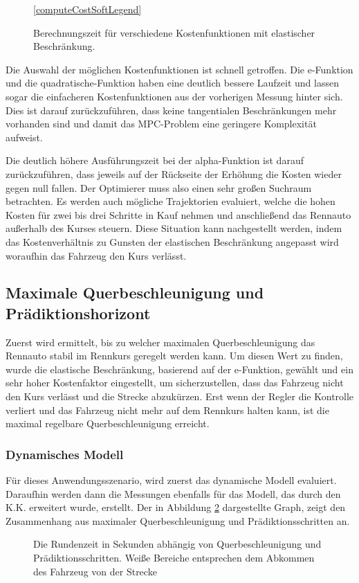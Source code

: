 \documentclass{like}
\begin{document}
\begin{figure}[ht!]
	\centering
	 
	\ref{computeCostSoftLegend}
	\caption{Berechnungszeit für verschiedene Kostenfunktionen mit elastischer Beschränkung.}
	\label{fig:computeCostSoftConst}
\end{figure}

Die Auswahl der möglichen Kostenfunktionen ist schnell getroffen. Die e-Funktion und die quadratische-Funktion haben eine deutlich bessere Laufzeit und lassen sogar die einfacheren Kostenfunktionen aus der vorherigen Messung hinter sich. Dies ist darauf zurückzuführen, dass keine tangentialen Beschränkungen mehr vorhanden sind und damit das \ac{MPC}-Problem eine geringere Komplexität aufweist.

Die deutlich höhere Ausführungszeit bei der alpha-Funktion ist darauf zurückzuführen, dass jeweils auf der Rückseite der Erhöhung die Kosten wieder gegen null fallen. Der Optimierer muss also einen sehr großen Suchraum betrachten. Es werden auch mögliche Trajektorien evaluiert, welche die hohen Kosten für zwei bis drei Schritte in Kauf nehmen und anschließend das Rennauto außerhalb des Kurses steuern. Diese Situation kann nachgestellt werden, indem das Kostenverhältnis zu Gunsten der elastischen Beschränkung angepasst wird woraufhin das Fahrzeug den Kurs verlässt.  


\subsection{Maximale Querbeschleunigung und Prädiktionshorizont}
Zuerst wird ermittelt, bis zu welcher maximalen Querbeschleunigung das Rennauto stabil im Rennkurs geregelt werden kann. Um diesen Wert zu finden, wurde die elastische Beschränkung, basierend auf der e-Funktion, gewählt und ein sehr hoher Kostenfaktor eingestellt, um sicherzustellen, dass das Fahrzeug nicht den Kurs verlässt und die Strecke abzukürzen. Erst wenn der Regler die Kontrolle verliert und das Fahrzeug nicht mehr auf dem Rennkurs halten kann, ist die maximal regelbare Querbeschleunigung erreicht.

\subsubsection{Dynamisches Modell}
Für dieses Anwendungsszenario, wird zuerst das dynamische Modell evaluiert. Daraufhin werden dann die Messungen ebenfalls für das Modell, das durch den \ac{K.K.} erweitert wurde, erstellt.
Der in Abbildung \ref{fig:betaMaxN} dargestellte Graph, zeigt den Zusammenhang aus maximaler Querbeschleunigung und Prädiktionsschritten an. 
\begin{figure}[ht!]
	\centering
	 
	\caption{Die Rundenzeit in Sekunden abhängig von Querbeschleunigung und Prädiktionsschritten. Weiße Bereiche entsprechen dem Abkommen des Fahrzeug von der Strecke}
	\label{fig:betaMaxN}
\end{figure}
\end{document}
